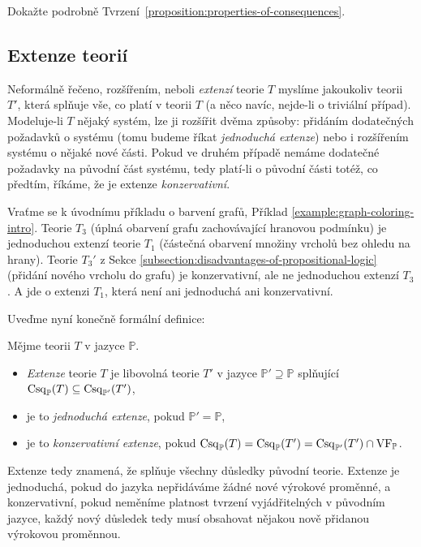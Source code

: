 \begin{exercise}
    Dokažte podrobně Tvrzení~\ref{proposition:properties-of-consequences}.
\end{exercise}

\subsection{Extenze teorií}

Neformálně řečeno, rozšířením, neboli \emph{extenzí} teorie $T$ myslíme jakoukoliv teorii $T'$, která splňuje vše, co platí v teorii $T$ (a něco navíc, nejde-li o triviální případ). Modeluje-li $T$ nějaký systém, lze ji rozšířit dvěma způsoby: přidáním dodatečných požadavků o systému (tomu budeme říkat \emph{jednoduchá extenze}) nebo i rozšířením systému o nějaké nové části. Pokud ve druhém případě nemáme dodatečné požadavky na původní část systému, tedy platí-li o původní části totéž, co předtím, říkáme, že je extenze \emph{konzervativní}.

\begin{example}
    Vraťme se k úvodnímu příkladu o barvení grafů, Příklad \ref{example:graph-coloring-intro}. Teorie $T_3$ (úplná obarvení grafu zachovávající hranovou podmínku) je jednoduchou extenzí teorie $T_1$ (částečná obarvení množiny vrcholů bez ohledu na hrany). Teorie $T_3'$ z Sekce \ref{subsection:disadvantages-of-propositional-logic} (přidání nového vrcholu do grafu) je konzervativní, ale ne jednoduchou extenzí $T_3$. A jde o extenzi $T_1$, která není ani jednoduchá ani konzervativní.
\end{example}

Uveďme nyní konečně formální definice:

\begin{definition}
    Mějme teorii $T$ v jazyce $\mathbb P$.
    \begin{itemize}
        \item \emph{Extenze} teorie $T$ je libovolná teorie $T'$ v jazyce $\mathbb P'\supseteq\mathbb P$ splňující $\operatorname{Csq}_\mathbb P(T)\subseteq\operatorname{Csq}_{\mathbb P'}(T')$,
        \item je to \emph{jednoduchá extenze}, pokud $\mathbb P'=\mathbb P$,
        \item je to \emph{konzervativní extenze}, pokud $\operatorname{Csq}_\mathbb P(T)=\operatorname{Csq}_\mathbb P(T')=\operatorname{Csq}_{\mathbb P'}(T')\cap \operatorname{VF}_\mathbb P$.
    \end{itemize}
\end{definition}
Extenze tedy znamená, že splňuje všechny důsledky původní teorie. Extenze je jednoduchá, pokud do jazyka nepřidáváme žádné nové výrokové proměnné, a konzervativní, pokud neměníme platnost tvrzení vyjádřitelných v původním jazyce, každý nový důsledek tedy musí obsahovat nějakou nově přidanou výrokovou proměnnou.


